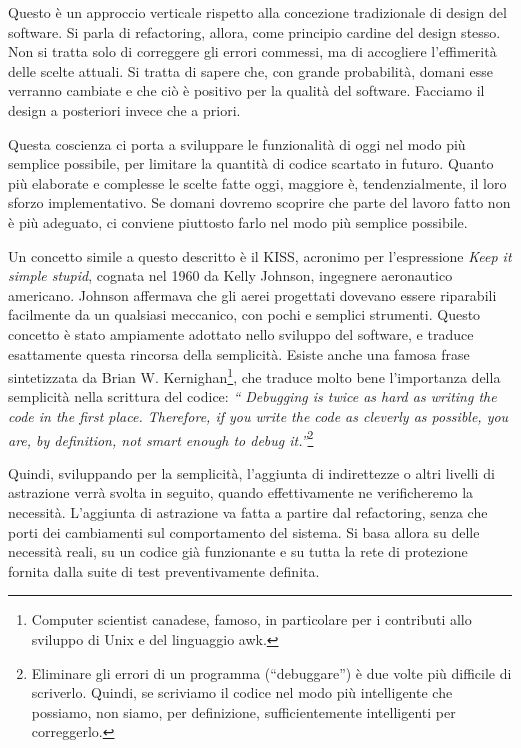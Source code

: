 \documentclass[12pt]{report}
\begin{document}
Questo è un approccio verticale rispetto alla
concezione tradizionale di design del software.
Si parla di refactoring, allora, come principio cardine del
design stesso. Non si tratta solo di correggere gli errori commessi, ma di
accogliere l'effimerità delle scelte attuali. Si tratta di sapere che, con grande
probabilità, domani esse verranno cambiate e che ciò è positivo per la
qualità del software. Facciamo il design a posteriori invece che a priori.

Questa coscienza ci porta a sviluppare le funzionalità di oggi nel modo
più semplice possibile, per limitare la quantità di codice scartato in futuro. 
Quanto più elaborate e complesse le scelte fatte oggi,
maggiore è, tendenzialmente, il loro sforzo implementativo. Se domani 
dovremo scoprire che parte del lavoro fatto non è più adeguato, ci conviene
piuttosto farlo nel modo più semplice possibile. 

Un concetto simile a questo descritto è il KISS, acronimo per l'espressione
\textit{Keep it simple stupid}, cognata nel 1960 da Kelly Johnson, ingegnere
aeronautico americano. Johnson affermava che gli aerei progettati 
dovevano essere riparabili facilmente da un qualsiasi meccanico,
con pochi e semplici strumenti. Questo concetto è stato ampiamente 
adottato nello sviluppo del software, e traduce esattamente 
questa rincorsa della semplicità.
Esiste anche una famosa frase sintetizzata da Brian W. Kernighan\footnote{
Computer scientist canadese, famoso, in particolare per i contributi allo
sviluppo di Unix e del linguaggio awk.}, che traduce
molto bene l'importanza della semplicità nella scrittura del codice: 
\textit{``
Debugging is twice as hard as writing the code in the first place. 
Therefore, if you write the code as cleverly as possible, you are, 
by definition, not smart enough to debug it.''}\footnote{
	Eliminare gli errori di un programma (``debuggare'') è due volte più
	difficile di scriverlo. Quindi, se scriviamo il codice nel modo più 
	intelligente che possiamo, non siamo, per definizione, sufficientemente 
	intelligenti per correggerlo.
}

Quindi, sviluppando per la semplicità, l'aggiunta di indirettezze 
o altri livelli di astrazione verrà 
svolta in seguito, quando effettivamente ne verificheremo la necessità. 
L'aggiunta di astrazione va fatta a partire dal refactoring, 
senza che porti dei cambiamenti sul comportamento del
sistema. Si basa allora su delle necessità reali, su un codice già
funzionante e su tutta la rete di protezione fornita dalla suite di 
test preventivamente definita. 
\end{document}

